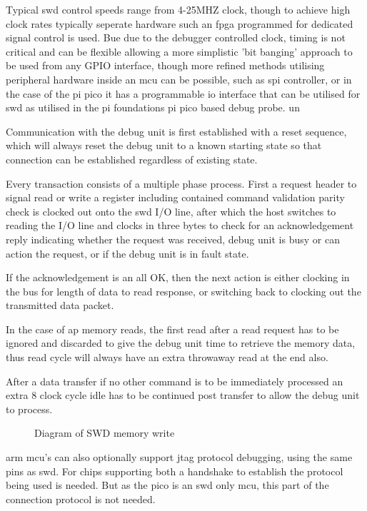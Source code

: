 Typical \gls{swd} control speeds range from 4-25MHZ clock, though to achieve high clock rates typically seperate hardware such an \gls{fpga} programmed for dedicated signal control is used. Bue due to the debugger controlled clock, timing is not critical and can be flexible allowing a more simplistic 'bit banging' approach to be used from any GPIO interface, though more refined methods utilising peripheral hardware inside an \gls{mcu} can be possible, such as \gls{spi} controller, or in the case of the pi pico it has a programmable io interface that can be utilised for \gls{swd} as utilised in the pi foundations pi pico based debug probe. un

Communication with the debug unit is first established with a reset sequence, which will always reset the debug unit to a known starting state so that connection can be established regardless of existing state.

Every transaction consists of a multiple phase process. First a request header to signal read or write a register including contained command validation parity check is clocked out onto the \gls{swd} I/O line, after which the host switches to reading the I/O line and clocks in three bytes to check for an acknowledgement reply indicating whether the request was received, debug unit is busy or can action the request, or if the debug unit is in fault state.

If the acknowledgement is an all OK, then the next action is either clocking in the bus for length of data to read response, or switching back to clocking out the  transmitted data packet.

In the case of \gls{ap} memory reads, the first read after a read request has to be ignored and discarded to give the debug unit time to retrieve the memory data, thus read cycle will always have an extra throwaway read at the end also.

After a data transfer if no other command is to be immediately processed an extra 8 clock cycle idle has to be continued post transfer to allow the debug unit to process.

\begin{figure}[ht]
	\centering
	\caption{Diagram of SWD memory write\cite{ARMDebugInterface}}
	\label{fig:armswdwrite}
\end{figure}
\clearpage

\gls{arm} \gls{mcu}'s can also optionally support \gls{jtag} protocol debugging, using the same pins as \gls{swd}. For chips supporting both a handshake to establish the protocol being used is needed. But as the pico is an \gls{swd} only \gls{mcu}, this part of the connection protocol is not needed.

